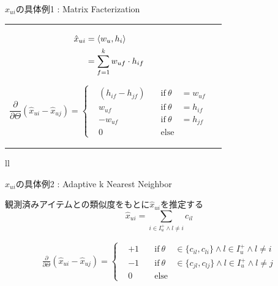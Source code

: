 \documentclass[aspectratio=43, dvipdfmx, 11pt]{beamer} %
\begin{document}
\begin{frame}{$x_{ui}$の具体例1 : Matrix Facterization}
\begin{tabular}{ll}
   \begin{minipage}{0.3\hsize}
        \begin{flushleft}
        \begin{equation*}
            \begin{aligned}
                \hat{x}_{ui} &= \braket{w_u,h_i}\\
                            &= \sum_{f=1}^k w_{uf}\cdot h_{if}                    
            \end{aligned}
        \end{equation*}
         \end{flushleft}
    \end{minipage}
    \begin{minipage}{0.7\hsize}
        \begin{flushleft}
            \begin{equation*}
                \frac{\partial}{\partial \Theta}(\hat{x}_{ui}-\hat{x}_{uj})=
                \left\{
                \begin{aligned}
                &(h_{if}-h_{jf})\quad &\text{if}\ \theta&=w_{uf}\\
                &w_{uf}&\text{if}\ \theta&=h_{if}\\
                &-w_{uf}&\text{if}\ \theta&=h_{jf}\\
                &0 &\text{else}                \end{aligned}
                \right.
            \end{equation*}
        \end{flushleft}
    \end{minipage}
\end{tabular}{ll}
\end{frame}

\begin{frame}{$x_{ui}$の具体例2 : Adaptive k Nearest Neighbor}
    
    観測済みアイテムとの類似度をもとに$\hat{x}_{ui}$を推定する
    \LARGE \[\hat{x}_{ui}=\sum_{i \in I^+_u \land l \neq i}c_{il}\]

    \large    \begin{equation*}
            \begin{aligned}
                \frac{\partial}{\partial \Theta}(\hat{x}_{ui}-\hat{x}_{uj})=
                \left\{
                \begin{aligned}
                &+1 \quad &\text{if}\ \theta&\in \{c_{il},c_{li}\} \land l\in I^+_u \land l \neq i\\
                &-1&\text{if}\ \theta&\in \{c_{jl},c_{lj}\} \land l\in I^+_u \land l \neq j\\
                &0 &\text{else}
            \end{aligned}
                \right.
    \end{aligned}
            \end{equation*}
    

\end{frame}
\end{document}
